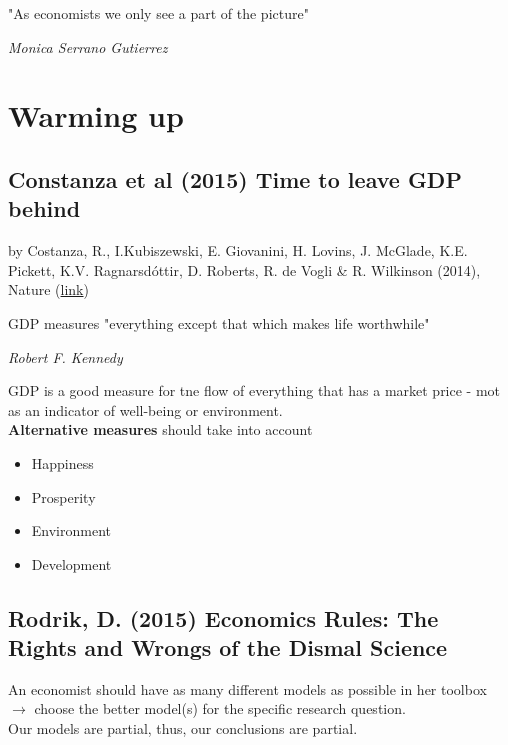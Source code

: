 \epigraph{"As economists we only see a part of the picture"}
{\textit{Monica Serrano Gutierrez}}

\section{Warming up}
\noindent
\begin{multicols}{2}
 \subsection{Constanza et al (2015) Time to leave GDP behind}
 by Costanza, R., I.Kubiszewski, E. Giovanini, H. Lovins, J. McGlade, K.E. Pickett, K.V. Ragnarsdóttir, D. Roberts, R. de Vogli \& R. Wilkinson (2014), Nature (\href{http://www.nature.com/news/development-time-to-leave-gdp-behind-1.14499}{link})
 \epigraph{GDP measures "everything except that which makes life worthwhile"}
 {\textit{Robert F. Kennedy}}
 \noindent
 GDP is a good measure for tne flow of everything that has a market price - mot as an indicator of well-being or environment.
 \\
 \textbf{Alternative measures} should take into account
 \begin{itemize}
  \item Happiness
  \item Prosperity
  \item Environment
  \item Development
 \end{itemize}
 \subsection{Rodrik, D. (2015) Economics Rules: The Rights and Wrongs of the Dismal Science }
 \noindent
 An economist should have as many different models as possible in her toolbox\\
 $\rightarrow$ choose the better model(s) for the specific research question.
 \\
 Our models are partial, thus, our conclusions are partial.


\end{multicols}
